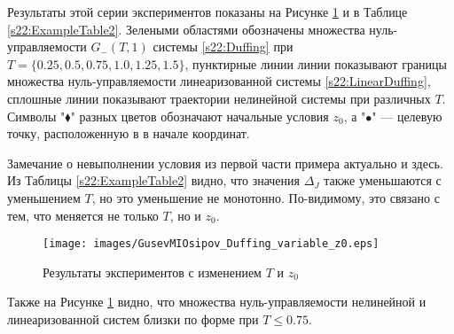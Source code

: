 \documentclass[../main.tex]{subfiles}
\begin{document}
Результаты этой серии экспериментов 
показаны на Рисунке \ref{s22:fig:series2} и в Таблице 
\ref{s22:ExampleTable2}.
Зелеными областями обозначены множества нуль-управляемости $G_{-}(T,1)$ системы 
\eqref{s22:Duffing} при $T = \{0.25, 0.5, 0.75, 1.0, 1.25, 1.5\}$, пунктирные линии 
линии показывают границы множества нуль-управляемости линеаризованной системы 
\eqref{s22:LinearDuffing}, сплошные линии показывают траектории нелинейной системы 
при различных $T$. 
Символы "$\blacklozenge$" разных цветов обозначают 
начальные условия $z_0$, а "$\bullet$" --- целевую точку, расположенную в 
в начале координат. 

Замечание о невыполнении условия из первой части примера актуально и здесь. 
Из Таблицы \ref{s22:ExampleTable2} видно, что значения $\Delta_J$ также уменьшаются с уменьшением $T$, но это уменьшение не монотонно. 
По-видимому, это связано с тем, что меняется не только $T$, но и $z_0$.

\begin{figure}
    \centering
    \texttt{[image: images/GusevMIOsipov\_Duffing\_variable\_z0.eps]}
    \caption{Результаты экспериментов с изменением $T$ и $z_0$}
    \label{s22:fig:series2}
\end{figure}

Также на Рисунке \ref{s22:fig:series2} видно, что множества нуль-управляемости нелинейной и линеаризованной систем близки по форме при $ T \leqslant 0.75$.
\end{document}

